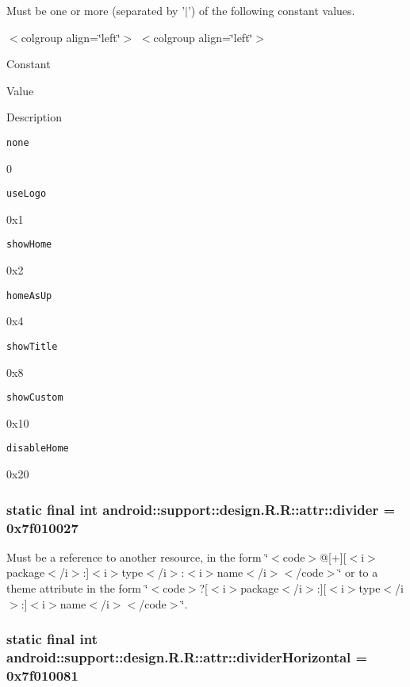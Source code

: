 Must be one or more (separated by '$|$') of the following constant values. \begin{TabularC}{0}
\hline
\end{TabularC}
$<$colgroup align=\char`\"{}left\char`\"{}$>$ $<$colgroup align=\char`\"{}left\char`\"{}$>$ 

Constant

Value

Description 

{\tt none}

0

{\tt useLogo}

0x1

{\tt showHome}

0x2

{\tt homeAsUp}

0x4

{\tt showTitle}

0x8

{\tt showCustom}

0x10

{\tt disableHome}

0x20\hypertarget{classandroid_1_1support_1_1design_1_1_r_1_1attr_c3a7f51dc5c19f11fa3a88922c1b9796}{
\subsubsection[{divider}]{\setlength{\rightskip}{0pt plus 5cm}static final int android::support::design.R.R::attr::divider = 0x7f010027}}
\label{classandroid_1_1support_1_1design_1_1_r_1_1attr_c3a7f51dc5c19f11fa3a88922c1b9796}


Must be a reference to another resource, in the form \char`\"{}$<$code$>$@\mbox{[}+\mbox{]}\mbox{[}$<$i$>$package$<$/i$>$:\mbox{]}$<$i$>$type$<$/i$>$:$<$i$>$name$<$/i$>$$<$/code$>$\char`\"{} or to a theme attribute in the form \char`\"{}$<$code$>$?\mbox{[}$<$i$>$package$<$/i$>$:\mbox{]}\mbox{[}$<$i$>$type$<$/i$>$:\mbox{]}$<$i$>$name$<$/i$>$$<$/code$>$\char`\"{}. \hypertarget{classandroid_1_1support_1_1design_1_1_r_1_1attr_f3bc8dea278fcf821fe03d0d9e8e5488}{
\subsubsection[{dividerHorizontal}]{\setlength{\rightskip}{0pt plus 5cm}static final int android::support::design.R.R::attr::dividerHorizontal = 0x7f010081}}
\label{classandroid_1_1support_1_1design_1_1_r_1_1attr_f3bc8dea278fcf821fe03d0d9e8e5488}


